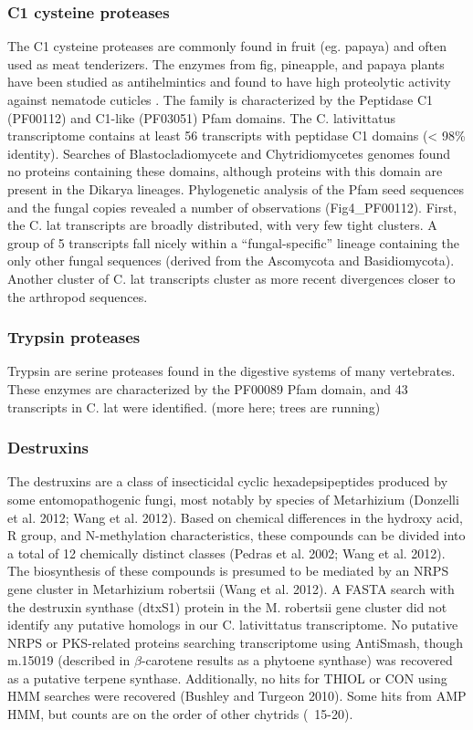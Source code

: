 \subsubsection{C1 cysteine proteases} 
The C1 cysteine proteases are commonly found in fruit (eg. papaya) and often used as meat tenderizers. The enzymes from fig, pineapple, and papaya plants have been studied as antihelmintics and found to have high proteolytic activity against nematode cuticles \cite{Stepek2004}. The family is characterized by the Peptidase C1 (PF00112) and C1-like (PF03051) Pfam domains. The C. lativittatus transcriptome contains at least 56 transcripts with peptidase C1 domains (< 98\% identity). Searches of Blastocladiomycete and Chytridiomycetes genomes found no proteins containing these domains, although proteins with this domain are present in the Dikarya lineages. Phylogenetic analysis of the Pfam seed sequences and the fungal copies revealed a number of observations (Fig4\_PF00112). First, the C. lat transcripts are broadly distributed, with very few tight clusters. A group of 5 transcripts fall nicely within a “fungal-specific” lineage containing the only other fungal sequences (derived from the Ascomycota and Basidiomycota). Another cluster of C. lat transcripts cluster as more recent divergences closer to the arthropod sequences. \\
\subsubsection{Trypsin proteases}
Trypsin are serine proteases found in the digestive systems of many vertebrates. These enzymes are characterized by the PF00089 Pfam domain, and 43 transcripts in C. lat were identified. (more here; trees are running)
\subsubsection{Destruxins}
 The destruxins are a class of insecticidal cyclic hexadepsipeptides produced by some entomopathogenic fungi, most notably by species of Metarhizium (Donzelli et al. 2012; Wang et al. 2012). Based on chemical differences in the hydroxy acid, R group, and N-methylation characteristics, these compounds can be divided into a total of 12 chemically distinct classes (Pedras et al. 2002; Wang et al. 2012). The biosynthesis of these compounds is presumed to be mediated by an NRPS gene cluster in Metarhizium robertsii (Wang et al. 2012). A FASTA search with the destruxin synthase (dtxS1) protein in the M. robertsii gene cluster did not identify any putative homologs in our C. lativittatus transcriptome. No putative NRPS or PKS-related proteins searching transcriptome using AntiSmash, though m.15019 (described in $\beta$-carotene results as a phytoene synthase) was recovered as a putative terpene synthase. Additionally, no hits for THIOL or CON using HMM searches were recovered (Bushley and Turgeon 2010). Some hits from AMP HMM, but counts are on the order of other chytrids (~15-20).
